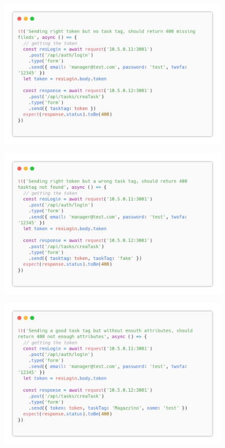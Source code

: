 \documentclass{report}
\begin{document}
\begin{figure}[H]
	\centering\includegraphics[width=1\textwidth]{images/code_crea_task_test3.png}
\end{figure}
\begin{figure}[H]
	\centering\includegraphics[width=1\textwidth]{images/code_crea_task_test4.png}
\end{figure}
\begin{figure}[H]
	\centering\includegraphics[width=1\textwidth]{images/code_crea_task_test5.png}
\end{figure}
\end{document}
